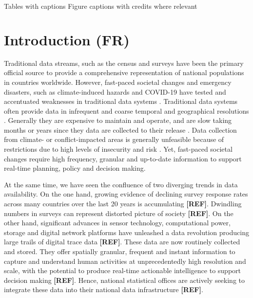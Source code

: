 \documentclass[]{rsos}%
\begin{document}
Tables with captions Figure captions with credits where relevant

\newpage

\hypertarget{introduction-fr}{%
\section{Introduction (FR)}\label{introduction-fr}}

Traditional data streams, such as the census and surveys have been the
primary official source to provide a comprehensive representation of
national populations in countries worldwide. However, fast-paced
societal changes and emergency disasters, such as climate-induced
hazards and COVID-19 have tested and accentuated weaknesses in
traditional data systems \citep{green2021}. Traditional data systems often
provide data in infrequent and coarse temporal and geographical
resolutions \citep{rowe23-bigdata}. Generally they are expensive to maintain
and operate, and are slow taking months or years since they data are
collected to their release \citep{rowe23-bigdata}. Data collection from
climate- or conflict-impacted areas is generally unfeasible because of
restrictions due to high levels of insecurity and risk
\citep{iradukunda2025}. Yet, fast-paced societal changes require high
frequency, granular and up-to-date information to support real-time
planning, policy and decision making.

At the same time, we have seen the confluence of two diverging trends in
data availability. On the one hand, growing evidence of declining survey
response rates across many countries over the last 20 years is
accumulating \textbf{{[}REF{]}}. Dwindling numbers in surveys can represent
distorted picture of society \textbf{{[}REF{]}}. On the other hand, significant
advances in sensor technology, computational power, storage and digital
network platforms have unleashed a data revolution producing large
trails of digital trace data \textbf{{[}REF{]}}. These data are now routinely
collected and stored. They offer spatially granular, frequent and
instant information to capture and understand human activities at
unprecedentedly high resolution and scale, with the potential to produce
real-time actionable intelligence to support decision making \textbf{{[}REF{]}}.
Hence, national statistical offices are actively seeking to integrate
these data into their national data infrastructure \textbf{{[}REF{]}}.
\end{document}
